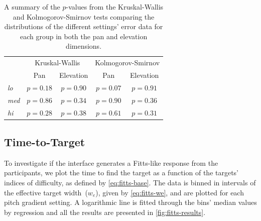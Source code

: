 \documentclass[acmsmall]{acmart}
\begin{document}
\begin{table}
  \centering
  \caption{A summary of the $p$-values from the Kruskal-Wallis and Kolmogorov-Smirnov tests comparing the distributions of the different settings' error data for each group in both the pan and elevation dimensions. }\label{tab:inter-group-results}
  \begin{tabular}{lcccc}
    \toprule
		   & \multicolumn{2}{c}{Kruskal-Wallis} & \multicolumn{2}{c}{Kolmogorov-Smirnov} \\
		   & Pan      & Elevation & Pan      & Elevation \\ \midrule
      \textit{lo}  & $p=0.18$ & $p=0.90$  & $p=0.07$ & $p=0.91$  \\
      \textit{med} & $p=0.86$ & $p=0.34$  & $p=0.90$ & $p=0.36$  \\
      \textit{hi}  & $p=0.28$ & $p=0.38$  & $p=0.61$ & $p=0.31$  \\
    \bottomrule
  \end{tabular}
\end{table}

\subsection{Time-to-Target}

To investigate if the interface generates a Fitts-like response from the participants, we plot the time to find the target as a function of the targets' indices of difficulty, as defined by \cref{eq:fitts-base}.
The data is binned in intervals of the effective target width~($w_e$), given by \cref{eq:fitts-we}, and are plotted for each pitch gradient setting. 
A logarithmic line is fitted through the bins' median values by regression and all the results are presented in \cref{fig:fitts-results}.
\end{document}
